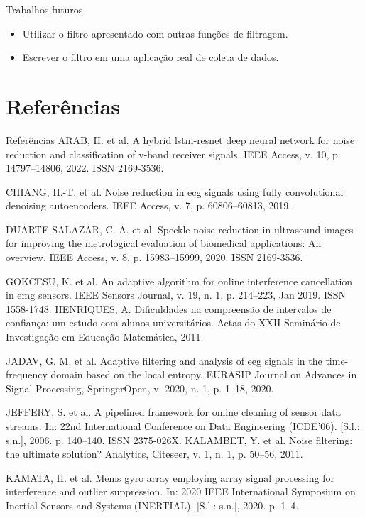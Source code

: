 \documentclass[]{beamer}
\begin{document}
\begin{frame}{Trabalhos futuros}
	\begin{itemize}
		\item Utilizar o filtro apresentado com outras funções de filtragem.
    	\item Escrever o filtro em uma aplicação real de coleta de dados.
	\end{itemize}
\end{frame}

\section{Referências}

\begin{frame}[allowframebreaks]{Referências}
	ARAB, H. et al. A hybrid lstm-resnet deep neural network for noise reduction and
	classification of v-band receiver signals. IEEE Access, v. 10, p. 14797–14806, 2022. ISSN
	2169-3536.


	CHIANG, H.-T. et al. Noise reduction in ecg signals using fully convolutional denoising
	autoencoders. IEEE Access, v. 7, p. 60806–60813, 2019.


	DUARTE-SALAZAR, C. A. et al. Speckle noise reduction in ultrasound images for
	improving the metrological evaluation of biomedical applications: An overview. IEEE
	Access, v. 8, p. 15983–15999, 2020. ISSN 2169-3536.


	GOKCESU, K. et al. An adaptive algorithm for online interference cancellation in emg
	sensors. IEEE Sensors Journal, v. 19, n. 1, p. 214–223, Jan 2019. ISSN 1558-1748.
	HENRIQUES, A. Dificuldades na compreensão de intervalos de confiança: um estudo com
	alunos universitários. Actas do XXII Seminário de Investigação em Educação Matemática,
	2011.


	JADAV, G. M. et al. Adaptive filtering and analysis of eeg signals in the time-frequency
	domain based on the local entropy. EURASIP Journal on Advances in Signal Processing,
	SpringerOpen, v. 2020, n. 1, p. 1–18, 2020.


	JEFFERY, S. et al. A pipelined framework for online cleaning of sensor data streams.
	In: 22nd International Conference on Data Engineering (ICDE’06). [S.l.: s.n.], 2006. p.
	140–140. ISSN 2375-026X.
	KALAMBET, Y. et al. Noise filtering: the ultimate solution? Analytics, Citeseer, v. 1,
	n. 1, p. 50–56, 2011.


	KAMATA, H. et al. Mems gyro array employing array signal processing for interference
	and outlier suppression. In: 2020 IEEE International Symposium on Inertial Sensors and
	Systems (INERTIAL). [S.l.: s.n.], 2020. p. 1–4.



\end{frame}
\end{document}
